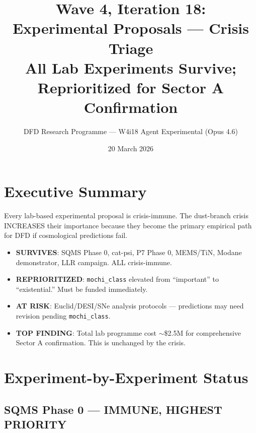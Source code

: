 \documentclass[11pt]{article}
\title{\textbf{Wave 4, Iteration 18:}\\
\textbf{Experimental Proposals --- Crisis Triage}\\[6pt]
{\large All Lab Experiments Survive; Reprioritized for Sector A Confirmation}}
\author{DFD Research Programme --- W4i18 Agent Experimental (Opus 4.6)}
\date{20 March 2026}
\begin{document}
\maketitle

\section*{Executive Summary}

\begin{tcolorbox}[colback=green!5!white, colframe=green!70!black,
  title=\textbf{W4i18: ALL LAB EXPERIMENTS SURVIVE AND ARE REPRIORITIZED}]

Every lab-based experimental proposal is crisis-immune. The dust-branch
crisis INCREASES their importance because they become the primary
empirical path for DFD if cosmological predictions fail.

\begin{itemize}
\item \textbf{SURVIVES}: SQMS Phase 0, cat-psi, P7 Phase 0, MEMS/TiN,
  Modane demonstrator, LLR campaign. ALL crisis-immune.
\item \textbf{REPRIORITIZED}: \texttt{mochi\_class} elevated from
  ``important'' to ``existential.'' Must be funded immediately.
\item \textbf{AT RISK}: Euclid/DESI/SNe analysis protocols --- predictions
  may need revision pending \texttt{mochi\_class}.
\item \textbf{TOP FINDING}: Total lab programme cost $\sim$\$2.5M for
  comprehensive Sector A confirmation. This is unchanged by the crisis.
\end{itemize}
\end{tcolorbox}

\section{Experiment-by-Experiment Status}

\subsection{SQMS Phase 0 --- IMMUNE, HIGHEST PRIORITY}
\end{document}
